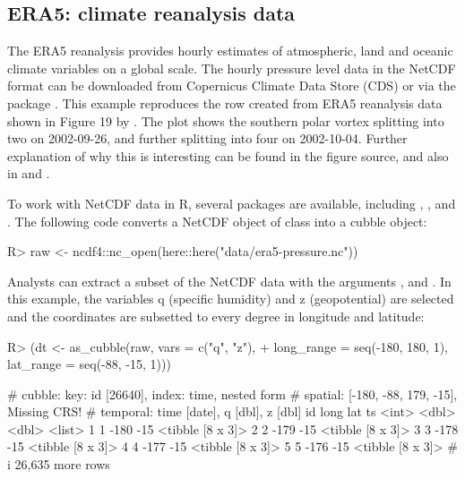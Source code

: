 \documentclass[
  shortnames]{jss}
\begin{document}
\hypertarget{era5-climate-reanalysis-data}{%
\subsection{ERA5: climate reanalysis data}\label{era5-climate-reanalysis-data}}

The ERA5 reanalysis \citep{hersbach2020era5} provides hourly estimates of atmospheric, land and oceanic climate variables on a global scale. The hourly pressure level data in the NetCDF format can be downloaded from Copernicus Climate Data Store (CDS) \citep{cds} or via the  package \citep{ecwmfr}. This example reproduces the row created from ERA5 reanalysis data shown in Figure 19 by \citet{hersbach2020era5}. The plot shows the southern polar vortex splitting into two on 2002-09-26, and further splitting into four on 2002-10-04. Further explanation of why this is interesting can be found in the figure source, and also in \citet{simmons2020global} and \citet{simmons2005ecmwf}.

To work with NetCDF data in R, several packages are available, including , , and . The following code converts a NetCDF object of class  into a cubble object:

\begin{CodeChunk}
\begin{CodeInput}
R> raw <- ncdf4::nc_open(here::here("data/era5-pressure.nc"))
\end{CodeInput}
\end{CodeChunk}

Analysts can extract a subset of the NetCDF data with the arguments ,  and . In this example, the variables q (specific humidity) and z (geopotential) are selected and the coordinates are subsetted to every degree in longitude and latitude:

\begin{CodeChunk}
\begin{CodeInput}
R> (dt <- as_cubble(raw, vars = c("q", "z"),
+                  long_range = seq(-180, 180, 1), lat_range = seq(-88, -15, 1)))
\end{CodeInput}
\begin{CodeOutput}
# cubble:   key: id [26640], index: time, nested form
# spatial:  [-180, -88, 179, -15], Missing CRS!
# temporal: time [date], q [dbl], z [dbl]
     id  long   lat ts              
  <int> <dbl> <dbl> <list>          
1     1  -180   -15 <tibble [8 x 3]>
2     2  -179   -15 <tibble [8 x 3]>
3     3  -178   -15 <tibble [8 x 3]>
4     4  -177   -15 <tibble [8 x 3]>
5     5  -176   -15 <tibble [8 x 3]>
# i 26,635 more rows
\end{CodeOutput}
\end{CodeChunk}
\end{document}
